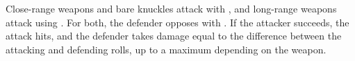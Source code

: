 
Close-range weapons and bare knuckles attack with , and long-range weapons attack using . For both, the defender opposes with . If the attacker succeeds, the attack hits, and the defender takes damage equal to the difference between the attacking and defending rolls, up to a maximum depending on the weapon.
